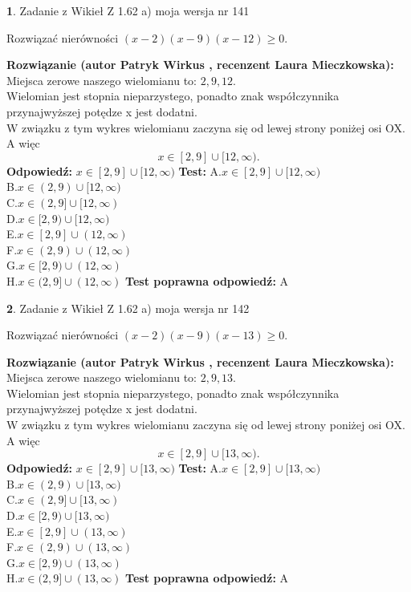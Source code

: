 \documentclass[12pt, a4paper]{article}
\theoremstyle{definition} %
\newtheorem{zad}{}
\newcommand{\zadStart}[1]{\begin{zad}#1\newline}
\newcommand{\zadStop}{\end{zad}}
\newcommand{\rozwStart}[2]{\noindent \textbf{Rozwiązanie (autor #1 , recenzent #2): }\newline}
\newcommand{\rozwStop}{\newline}
\newcommand{\odpStart}{\noindent \textbf{Odpowiedź:}\newline}
\newcommand{\odpStop}{\newline}
\newcommand{\testStart}{\noindent \textbf{Test:}\newline}
\newcommand{\testStop}{\newline}
\newcommand{\kluczStart}{\noindent \textbf{Test poprawna odpowiedź:}\newline}
\newcommand{\kluczStop}{\newline}
\begin{document}
\zadStart{Zadanie z Wikieł Z 1.62 a) moja wersja nr 141}

Rozwiązać nierówności $(x-2)(x-9)(x-12)\ge0$.
\zadStop
\rozwStart{Patryk Wirkus}{Laura Mieczkowska}
Miejsca zerowe naszego wielomianu to: $2, 9, 12$.\\
Wielomian jest stopnia nieparzystego, ponadto znak współczynnika przy\linebreak najwyższej potędze x jest dodatni.\\ W związku z tym wykres wielomianu zaczyna się od lewej strony poniżej osi OX. A więc $$x \in [2,9] \cup [12,\infty).$$
\rozwStop
\odpStart
$x \in [2,9] \cup [12,\infty)$
\odpStop
\testStart
A.$x \in [2,9] \cup [12,\infty)$\\
B.$x \in (2,9) \cup [12,\infty)$\\
C.$x \in (2,9] \cup [12,\infty)$\\
D.$x \in [2,9) \cup [12,\infty)$\\
E.$x \in [2,9] \cup (12,\infty)$\\
F.$x \in (2,9) \cup (12,\infty)$\\
G.$x \in [2,9) \cup (12,\infty)$\\
H.$x \in (2,9] \cup (12,\infty)$
\testStop
\kluczStart
A
\kluczStop



\zadStart{Zadanie z Wikieł Z 1.62 a) moja wersja nr 142}

Rozwiązać nierówności $(x-2)(x-9)(x-13)\ge0$.
\zadStop
\rozwStart{Patryk Wirkus}{Laura Mieczkowska}
Miejsca zerowe naszego wielomianu to: $2, 9, 13$.\\
Wielomian jest stopnia nieparzystego, ponadto znak współczynnika przy\linebreak najwyższej potędze x jest dodatni.\\ W związku z tym wykres wielomianu zaczyna się od lewej strony poniżej osi OX. A więc $$x \in [2,9] \cup [13,\infty).$$
\rozwStop
\odpStart
$x \in [2,9] \cup [13,\infty)$
\odpStop
\testStart
A.$x \in [2,9] \cup [13,\infty)$\\
B.$x \in (2,9) \cup [13,\infty)$\\
C.$x \in (2,9] \cup [13,\infty)$\\
D.$x \in [2,9) \cup [13,\infty)$\\
E.$x \in [2,9] \cup (13,\infty)$\\
F.$x \in (2,9) \cup (13,\infty)$\\
G.$x \in [2,9) \cup (13,\infty)$\\
H.$x \in (2,9] \cup (13,\infty)$
\testStop
\kluczStart
A
\kluczStop
\end{document}
